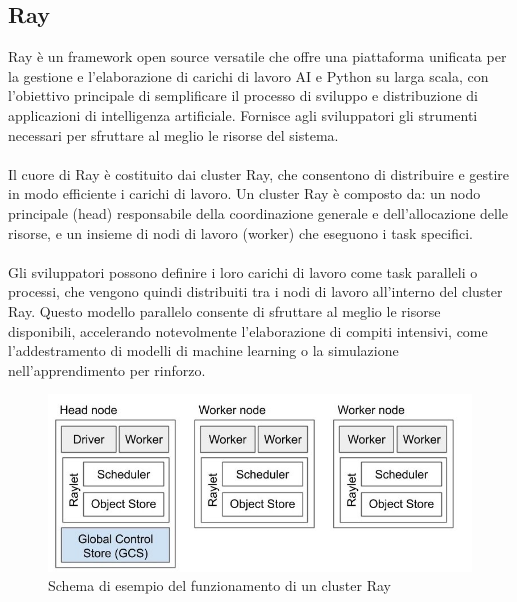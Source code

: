 \documentclass{article}
\begin{document}
    \clearpage
    \subsection{Ray}
    Ray è un framework open source versatile che offre una piattaforma unificata per la gestione e l'elaborazione di carichi di lavoro AI e Python su larga scala, con l'obiettivo principale di semplificare il processo di sviluppo e distribuzione di applicazioni di intelligenza artificiale. Fornisce agli sviluppatori gli strumenti necessari per sfruttare al meglio le risorse del sistema.\\
    \\
    Il cuore di Ray è costituito dai cluster Ray, che consentono di distribuire e gestire in modo efficiente i carichi di lavoro. Un cluster Ray è composto da: un nodo principale (head) responsabile della coordinazione generale e dell'allocazione delle risorse, e un insieme di nodi di lavoro (worker) che eseguono i task specifici.\\
    \\
    Gli sviluppatori possono definire i loro carichi di lavoro come task paralleli o processi, che vengono quindi distribuiti tra i nodi di lavoro all'interno del cluster Ray. Questo modello parallelo consente di sfruttare al meglio le risorse disponibili, accelerando notevolmente l'elaborazione di compiti intensivi, come l'addestramento di modelli di machine learning o la simulazione nell'apprendimento per rinforzo.
    
    \vspace{10pt}
    
    \begin{figure}[h!]
        \centering
        \includegraphics[width=\linewidth]{Architettura Ray cluster.jpg}
        \caption{Schema di esempio del funzionamento di un cluster Ray}
    \end{figure}
    
    \clearpage
    
\end{document}
